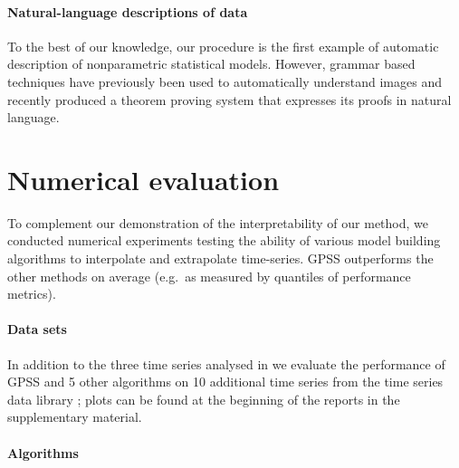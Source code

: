 \documentclass{article}
\def\eg{e.g.\ }
\begin{document}
\paragraph{Natural-language descriptions of data}

To the best of our knowledge, our procedure is the first example of automatic description of nonparametric statistical models.%
However, grammar based techniques have previously been used to automatically understand images \cite{zhu2007stochastic} and recently \citet{GanesalingamG13} produced a theorem proving system that expresses its proofs in natural language.








\section{Numerical evaluation}
\label{sec:numerical}

To complement our demonstration of the interpretability of our method, we conducted numerical experiments testing the ability of various model building algorithms to interpolate and extrapolate time-series.
GPSS outperforms the other methods on average (\eg as measured by quantiles of performance metrics).

\paragraph{Data sets}

In addition to the three time series analysed in \cite{DuvLloGroetal13} we evaluate the performance of GPSS and 5 other algorithms on 10 additional time series from the time series data library \citep{TSDL}; plots can be found at the beginning of the reports in the supplementary material.

\paragraph{Algorithms}
\end{document}
